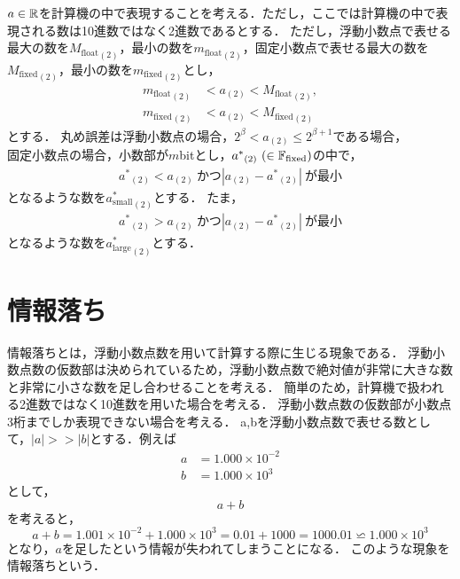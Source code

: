 $a \in \mathbb{R}$を計算機の中で表現することを考える．ただし，ここでは計算機の中で表現される数は10進数ではなく2進数であるとする．
ただし，浮動小数点で表せる最大の数を${M_{\mathrm{float}}}_{(2)}$，最小の数を${m_{\mathrm{float}}}_{(2)}$，固定小数点で表せる最大の数を${M_{\mathrm{fixed}}}_{(2)}$，最小の数を${m_{\mathrm{fixed}}}_{(2)}$とし，
\begin{align}
   {m_{\mathrm{float}}}_{(2)} &< a_{(2)} < {M_{\mathrm{float}}}_{(2)}, \\
   {m_{\mathrm{fixed}}}_{(2)} &< a_{(2)} < {M_{\mathrm{fixed}}}_{(2)}
\end{align}
とする．
丸め誤差は浮動小数点の場合，$2^{\beta} < a_{(2)} \leq 2^{\beta+1}$である場合，\\
固定小数点の場合，小数部が$m$bitとし，${a^{\ast}}_{(2)} \ (\in\mathbb{F}_{\text{fixed}})$の中で，
\begin{align}
    {a^{\ast}}_{(2)} < a_{(2)}\ \text{かつ} |a_{(2)} - {a^{\ast}}_{(2)}| \ \text{が最小}
\end{align}
となるような数を${a^{\ast}_{\mathrm{small}}}_{(2)}$とする．
たま，
\begin{align}
    {a^{\ast}}_{(2)} > a_{(2)} \ \text{かつ} |a_{(2)} - {a^{\ast}}_{(2)}| \ \text{が最小}
\end{align}
となるような数を${a^{\ast}_{\mathrm{large}}}_{(2)}$とする．
\section{情報落ち}
情報落ちとは，浮動小数点数を用いて計算する際に生じる現象である．
浮動小数点数の仮数部は決められているため，浮動小数点数で絶対値が非常に大きな数と非常に小さな数を足し合わせることを考える．
簡単のため，計算機で扱われる2進数ではなく10進数を用いた場合を考える．
浮動小数点数の仮数部が小数点3桁までしか表現できない場合を考える．
a,bを浮動小数点数で表せる数として，$|a| >> |b|$とする．例えば
\begin{align}
    a &= 1.000 \times 10^{-2} \\
    b &= 1.000 \times 10^{3}
\end{align}
として，
\begin{equation}
    a + b
\end{equation}
を考えると，
\begin{equation}
    a + b = 1.001 \times 10^{-2} + 1.000 \times 10^{3} = 0.01 + 1000 = 1000.01 \backsimeq 1.000 \times 10^{3}
\end{equation}
となり，$a$を足したという情報が失われてしまうことになる．
このような現象を情報落ちという．

